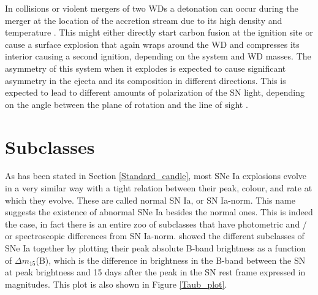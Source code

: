 \documentclass[a4paper,oneside,12pt, class=Latex/Classes/PhDthesisPSnPDF, crop=false]{standalone}
\begin{document}
In collisions or violent mergers of two WDs a detonation can occur during the merger at the location of the accretion stream due to its high density and temperature \citep{Rosswog_merger, Pakmor_merger, Pakmor_merger2}. This might either directly start carbon fusion at the ignition site or cause a surface explosion that again wraps around the WD and compresses its interior causing a second ignition, depending on the system and WD masses. The asymmetry of this system when it explodes is expected to cause significant asymmetry in the ejecta and its composition in different directions. This is expected to lead to different amounts of polarization of the SN light, depending on the angle between the plane of rotation and the line of sight \citep{Wang_merger_pol, Bulla_merger_pol}.

\section{Subclasses}
As has been stated in Section \ref{Standard_candle}, most SNe Ia explosions evolve in a very similar way with a tight relation between their peak, colour, and rate at which they evolve. These are called normal SN Ia, or SN Ia-norm. This name suggests the existence of abnormal SNe Ia besides the normal ones. This is indeed the case, in fact there is an entire zoo of subclasses that have photometric and / or spectroscopic differences from SN Ia-norm. \citet{Taubenberger_plot} showed the different subclasses of SNe Ia together by plotting their peak absolute B-band brightness as a function of $\Delta m_{15}$(B), which is the difference in brightness in the B-band between the SN at peak brightness and 15 days after the peak in the SN rest frame expressed in magnitudes. This plot is also shown in Figure \ref{Taub_plot}.
\end{document}
